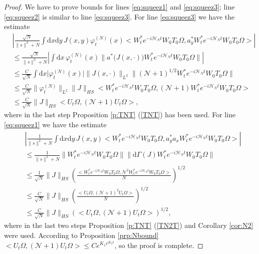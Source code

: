 \documentclass[11pt,a4paper,draft,DIV11]{scrartcl}	%
\newcommand{\di}{\textrm{d}}		%
\newcommand{\Ncal}{\mathcal{N}}		%
\newcommand{\Hcal}{\mathcal{H}}		%
\newcommand{\scal}[2]{\big<#1,#2\big>} %
\newcommand{\norm}[1]{\lVert#1\rVert}	%
\newcommand{\ph}{\varphi_t^{(N)}}	%
\begin{document}
\begin{proof}
We have to prove bounds for lines \eqref{eq:squeez1} and \eqref{eq:squeez3}; line \eqref{eq:squeez2} is similar to line \eqref{eq:squeez3}.
For line \eqref{eq:squeez3} we have the estimate
\begin{align*}
& \left\lvert \frac{\sqrt{N}}{\norm{s}^2+N} \int \di x\di y\, J(x,y) \ph(x) \scal{W^\ast_t e^{-i\Hcal_N t}W_0 T_0 \Omega}{a^\ast_y W^\ast_t e^{-i\Hcal_N t}W_0 T_0 \Omega}  \right\rvert \\
& \leq \frac{\sqrt{N}}{\norm{s}^2+N}\left\lvert \int \di x\, \ph(x) \norm{a^\ast\big(J(x,\cdot)\big)W^\ast_t e^{-i\Hcal_N t} W_0 T_0 \Omega} \right\rvert\\
& \leq \frac{C}{\sqrt{N}} \int \di x \lvert \ph(x)\rvert \norm{J(x,\cdot)}_{L^2} \norm{(\Ncal+1)^{1/2} W^\ast_t e^{-i\Hcal_N t}W_0 T_0 \Omega} \\
& \leq \frac{C}{\sqrt{N}} \norm{\ph}_{L^2} \norm{J}_{HS} \scal{W^\ast_t e^{-i\Hcal_N t}W_0 T_0 \Omega}{(\Ncal+1)W^\ast_t e^{-i\Hcal_N t}W_0 T_0 \Omega} \\
& \leq \frac{C}{\sqrt{N}} \norm{J}_{HS} \scal{U_t \Omega}{(\Ncal+1)U_t \Omega},
\end{align*}
where in the last step Proposition \ref{p:TNT} (\ref{TNT}) has been used.
For line \eqref{eq:squeez1} we have the estimate
\begin{align*}
& \left\lvert \frac{1}{\norm{s}^2+N} \int \di x\di y\, J(x,y) \scal{W^\ast_t e^{-i\Hcal_N t}W_0 T_0 \Omega}{a^\ast_y a_x W^\ast_t e^{-i\Hcal_N t}W_0 T_0 \Omega} \right \rvert \\
& \leq \frac{1}{\norm{s}^2+N} \norm{W^\ast_t e^{-i\Hcal_N t}W_0 T_0 \Omega}\norm{\di\Gamma(J) W^\ast_t e^{-i\Hcal_N t}W_0 T_0 \Omega} \\
& \leq \frac{1}{\sqrt{N}} \norm{J}_{HS} \left( \frac{\scal{W^\ast_t e^{-i\Hcal_N t}W_0 T_0 \Omega}{\Ncal^2 W^\ast_t e^{-i\Hcal_N t}W_0 T_0 \Omega}}{N} \right)^{1/2} \\
& \leq \frac{C}{\sqrt{N}} \norm{J}_{HS} \left( \frac{\scal{U_t \Omega}{(\Ncal+1)^2 U_t \Omega}}{N} \right)^{1/2} \\
& \leq \frac{C}{\sqrt{N}} \norm{J}_{HS} \left( \scal{U_t \Omega}{(\Ncal+1) U_t \Omega} \right)^{1/2},
\end{align*}
where in the last two steps Proposition \ref{p:TNT} (\ref{TN2T}) and Corollary \ref{cor:N2} were used.
According to Proposition \ref{prp:Nbound} $\scal{U_t \Omega}{\left(\Ncal + 1\right) U_t \Omega} \leq C e^{K_1 e^{K_2 t}}$, so the proof is complete.
\end{proof}
\end{document}
